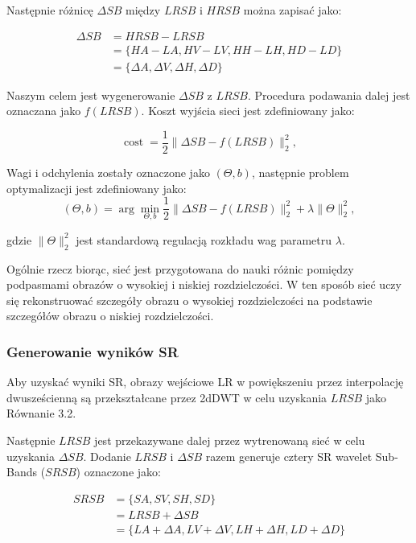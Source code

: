 Następnie różnicę $\Delta SB$ między $LRSB$ i $HRSB$ można zapisać jako:

\begin{equation}
    \begin{aligned}
    \Delta SB   & ={H R S B} - {L R S B} \\
                & =\{{HA}-{LA}, {HV}-{LV}, {HH}-{LH}, {HD}-{LD}\} \\
                & =\{\Delta {A}, \Delta {V}, \Delta {H}, \Delta {D}\}
    \end{aligned}
    \label{eq:3.4}
\end{equation}

Naszym celem jest wygenerowanie $\Delta SB$ z $LRSB$. Procedura podawania dalej jest oznaczana jako $f(LRSB)$. Koszt wyjścia sieci jest zdefiniowany jako:

\begin{equation}
    \operatorname{cost}=\frac{1}{2}\|\Delta SB-f(LRSB)\|_2^2,
\end{equation}


Wagi i odchylenia zostały oznaczone jako $(\Theta, b)$, następnie problem optymalizacji jest zdefiniowany jako:
\begin{equation}
    (\Theta, {b})=\arg \min _{\Theta, {b}} \frac{1}{2}\|\Delta SB-f(LRSB)\|_2^2+\lambda\|\Theta\|_2^2,
\end{equation}

gdzie $\|\Theta\|_2^2$ jest standardową regulacją rozkładu wag parametru $\lambda$.

Ogólnie rzecz biorąc, sieć jest przygotowana do nauki różnic pomiędzy podpasmami obrazów o wysokiej i niskiej rozdzielczości. W ten sposób sieć uczy się rekonstruować szczegóły obrazu o wysokiej rozdzielczości na podstawie szczegółów obrazu o niskiej rozdzielczości.

\subsubsection*{Generowanie wyników SR}
Aby uzyskać wyniki SR, obrazy wejściowe LR w powiększeniu przez interpolację dwusześcienną są przekształcane przez 2dDWT w celu uzyskania $LRSB$ jako Równanie 3.2.

Następnie $LRSB$ jest przekazywane dalej przez wytrenowaną sieć w celu uzyskania $\Delta SB$. Dodanie $LRSB$ i $\Delta SB$ razem generuje cztery SR wavelet Sub-Bands ($SRSB$) oznaczone jako:

\begin{equation}
    \begin{aligned}
    SRSB    & =\{SA, SV, SH, SD\} \\
            & =LRSB+\Delta SB \\
            & =\{LA+\Delta A, LV+\Delta V, LH+\Delta H, LD+\Delta D\}
\end{aligned}
\end{equation}

